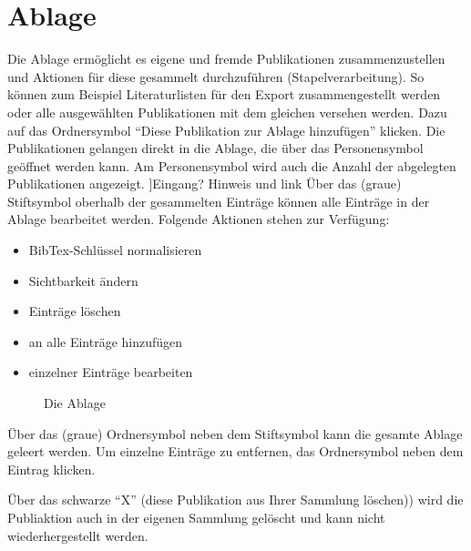 \section{Ablage}
\label{sec:ablage}
Die Ablage ermöglicht es eigene und fremde Publikationen zusammenzustellen und Aktionen für diese gesammelt durchzuführen (Stapelverarbeitung). So können zum Beispiel Literaturlisten für den Export zusammengestellt werden oder alle ausgewählten Publikationen mit dem gleichen \tag versehen werden. Dazu auf das Ordnersymbol \enquote{Diese Publikation zur Ablage hinzufügen} klicken. Die Publikationen gelangen direkt in die Ablage, die über das Personensymbol geöffnet werden kann. Am Personensymbol wird auch die Anzahl der abgelegten Publikationen angezeigt. \todo[inline]]{Eingang? Hinweis und link}
Über das (graue) Stiftsymbol oberhalb der gesammelten Einträge können alle Einträge in der Ablage bearbeitet werden. Folgende Aktionen stehen zur Verfügung:
\begin{itemize}
\item BibTex-Schlüssel normalisieren
\item Sichtbarkeit ändern
\item Einträge löschen
\item \tags an alle Einträge hinzufügen
\item \tags einzelner Einträge bearbeiten
\end{itemize}
\begin{figure}[h!]
 \centering
 \caption{Die Ablage}
 \label{fig:ablage}
\end{figure} 
Über das (graue) Ordnersymbol neben dem Stiftsymbol kann die gesamte Ablage geleert werden. Um einzelne Einträge zu entfernen, das Ordnersymbol neben dem Eintrag klicken. 
\begin{tip}Über das schwarze \enquote{X} (diese Publikation aus Ihrer Sammlung löschen)) wird die Publiaktion auch in der eigenen Sammlung gelöscht und kann nicht wiederhergestellt werden.
\end{tip}
